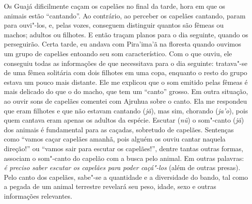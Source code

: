 Os Guajá dificilmente caçam os capelães no final da tarde, hora em que
os animais estão ``cantando''. Ao contrário, ao perceber os capelães
cantando, param para ouvi"-los, e, pelas vozes, conseguem distinguir
quantos são fêmeas ou machos; adultos ou filhotes. E então traçam planos
para o dia seguinte, quando os perseguirão. Certa tarde, eu andava com
Pira'ima'ã na floresta quando ouvimos um grupo de capelães entoando seu
som característico. Com o que ouviu, ele conseguiu todas as informações
de que necessitava para o dia seguinte: tratava"-se de uma fêmea
solitária com dois filhotes em uma copa, enquanto o resto do grupo
estava um pouco mais distante. Ele me explicou que o som emitido pelas
fêmeas é mais delicado do que o do macho, que tem um ``canto'' grosso. Em
outra situação, ao ouvir sons de capelães comentei com Ajruhua sobre o
canto. Ela me respondeu que eram filhotes e que não estavam cantando
(\emph{jã}), mas sim, chorando (\emph{ja'o}), pois quem cantava eram
apenas os adultos da espécie. Escutar (\emph{nũ}) o som"-canto
(\emph{jã}) dos animais é fundamental para as caçadas, sobretudo de
capelães. Sentenças como ``vamos caçar capelães amanhã, pois alguém os
ouviu cantar naquela direção!'' ou ``vamos sair para escutar os
capelães!'', dentre tantas outras formas, associam o som"-canto do capelão
com a busca pelo animal. Em outras palavras: \emph{é preciso saber
escutar os capelães para poder caçá"-los} (além de outras presas). Pelo
canto dos capelães, sabe"-se a quantidade e a diversidade do bando, tal
como a pegada de um animal terrestre revelará seu peso, idade, sexo e
outras informações relevantes.

